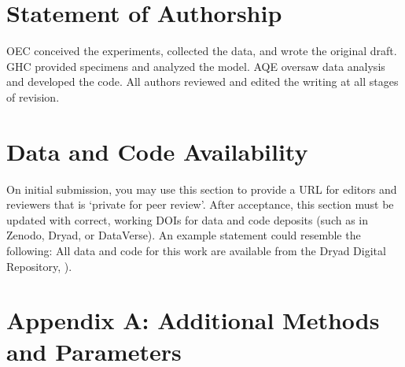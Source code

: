 \documentclass[11pt]{article}
\begin{document}
\section*{Statement of Authorship}

OEC conceived the experiments, collected the data, and wrote the original draft.
GHC provided specimens and analyzed the model.
AQE oversaw data analysis and developed the code. 
All authors reviewed and edited the writing at all stages of revision.

\section*{Data and Code Availability}

On initial submission, you may use this section to provide a URL for editors and reviewers that is `private for peer review'. After acceptance, this section must be updated with correct, working DOIs for data and code deposits (such as in Zenodo, Dryad, or DataVerse). An example statement could resemble the following: All data and code for this work are available from the Dryad Digital Repository, \citealt{CookEtAl2015}). 

\section*{Appendix A: Additional Methods and Parameters}

%
% 
%
%
%
%
\end{document}
